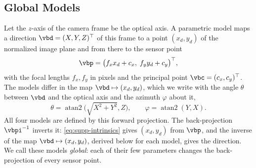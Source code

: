 \subsection{Global Models}
\label{sec:supp-global-models}
Let the $z$-axis of the camera frame be the optical axis. A
parametric model maps a direction $\vbd=(X,Y,Z)^\top$ of this frame
to a point $(x_d,y_d)$ of the normalized image plane and from there
to the sensor point
\begin{equation}
\label{eq:supp-intrinsics}
    \vbp = \bigl(f_x x_d + c_x,\; f_y y_d + c_y\bigr)^\top,
\end{equation}
with the focal lengths $f_x,f_y$ in pixels and the principal point
$\vbc=(c_x,c_y)^\top$. The models differ in the map
$\vbd\mapsto(x_d,y_d)$, which we write with the angle $\theta$
between $\vbd$ and the optical axis and the azimuth $\varphi$ about
it,
\begin{equation}
\label{eq:supp-angles}
    \theta=\operatorname{atan2}\bigl(\sqrt{X^2+Y^2},Z\bigr),
    \qquad \varphi=\operatorname{atan2}(Y,X).
\end{equation}
All four models are defined by this forward projection. The
back-projection $\vbpi^{-1}$ inverts it: \cref{eq:supp-intrinsics}
gives $(x_d,y_d)$ from $\vbp$, and the inverse of the map
$\vbd\mapsto(x_d,y_d)$, derived below for each model, gives the
direction. We call these models \emph{global}: each of their few
parameters changes the back-projection of every sensor point.

